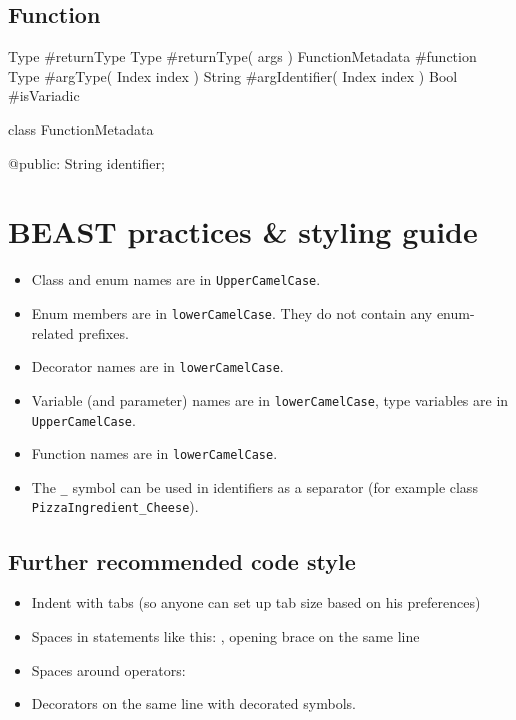 \section{Function}
\begin{code}
Type #returnType
Type #returnType( args )
FunctionMetadata #function
Type #argType( Index index )
String #argIdentifier( Index index )
Bool #isVariadic

class FunctionMetadata {
	
@public:
	String identifier;
	
	
}
\end{code}

\chapter{BEAST practices \& styling guide}

\begin{itemize}
	\item Class and enum names are in \verb|UpperCamelCase|.
	\item Enum members are in \verb|lowerCamelCase|. They do not contain any enum-related prefixes.
	\item Decorator names are in \verb|lowerCamelCase|.
	\item Variable (and parameter) names are in \verb|lowerCamelCase|, type variables are in \verb|UpperCamelCase|.
	\item Function names are in \verb|lowerCamelCase|.
	\item The \verb|_| symbol can be used in identifiers as a separator (for example class \verb|PizzaIngredient_Cheese|).
\end{itemize}

\section{Further recommended code style}
\begin{itemize}
	\item Indent with tabs (so anyone can set up tab size based on his preferences)
	\item Spaces in statements like this: , opening brace on the same line
	\item Spaces around operators: 
	\item Decorators on the same line with decorated symbols.
\end{itemize}

